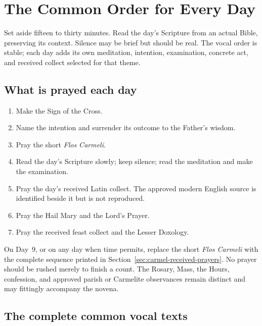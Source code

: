\section{The Common Order for Every Day}
\label{sec:carmel-common-order}

\enlargethispage{\baselineskip}
Set aside fifteen to thirty minutes. Read the day's Scripture from an actual Bible, preserving its context. Silence may be brief but should be real. The vocal order is stable; each day adds its own meditation, intention, examination, concrete act, and received collect selected for that theme.

\subsection{What is prayed each day}

\begin{enumerate}
\item Make the Sign of the Cross.
\item Name the intention and surrender its outcome to the Father's wisdom.
\item Pray the short \textit{Flos Carmeli}.
\item Read the day's Scripture slowly; keep silence; read the meditation and make the examination.
\item Pray the day's received Latin collect. The approved modern English source is identified beside it but is not reproduced.
\item Pray the Hail Mary and the Lord's Prayer.
\item Pray the received feast collect and the Lesser Doxology.
\end{enumerate}

On Day~9, or on any day when time permits, replace the short \textit{Flos Carmeli} with the complete sequence printed in Section~\ref{sec:carmel-received-prayers}. No prayer should be rushed merely to finish a count. The Rosary, Mass, the Hours, confession, and approved parish or Carmelite observances remain distinct and may fittingly accompany the novena.

\subsection{The complete common vocal texts}

\NovenaSignOfCross



